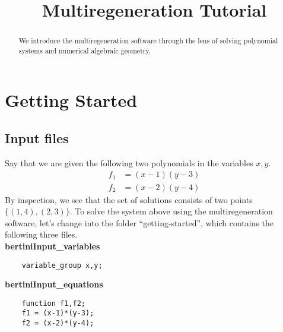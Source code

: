 \documentclass[12pt]{article}
\title{%
\vspace{-24pt}
Multiregeneration Tutorial
}
\author{}
\theoremstyle{definition}
\newcommand{\C}{\mathbb{C}}
\begin{document}
\maketitle
\begin{abstract} 
We introduce the multiregeneration software through the lens of solving polynomial systems and numerical algebraic geometry.
\end{abstract}

\section{Getting Started}
\subsection{Input files}
Say that we are given the following two polynomials
in the variables $x,y$. 
\begin{align*}
    f_1 &= (x-1)(y-3)\\
    f_2 &= (x-2)(y-4)
\end{align*}
By inspection, we see that the set of solutions consists of two points $\{ (1,4), (2,3)\}$.
To solve the system above using the multiregeneration software, let's change into the folder 
``getting-started'', which contains the following three files.\\

\noindent \textbf{bertiniInput\_variables}


\begin{leftbar}
\vspace{-10pt} 
\begin{verbatim}
    variable_group x,y; 
\end{verbatim}\vspace{-10pt} 
\end{leftbar}

\noindent \textbf{bertiniInput\_equations}


\begin{leftbar}
\vspace{-10pt} 
\begin{verbatim}
    function f1,f2;
    f1 = (x-1)*(y-3);
    f2 = (x-2)*(y-4);
\end{verbatim}\vspace{-10pt} 
\end{leftbar}
\end{document}
